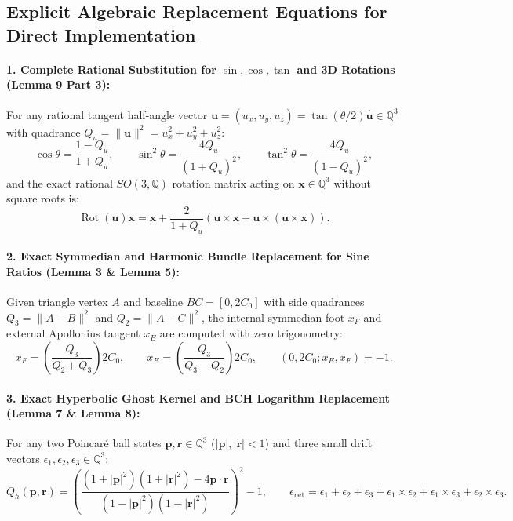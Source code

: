 \documentclass[11pt, a4paper]{article}
\begin{document}
\subsection{Explicit Algebraic Replacement Equations for Direct Implementation}

\paragraph{1. Complete Rational Substitution for $\sin, \cos, \tan$ and 3D Rotations (Lemma 9 Part 3):}
For any rational tangent half-angle vector $\mathbf{u} = (u_x, u_y, u_z) = \tan(\theta/2)\hat{\mathbf{u}} \in \mathbb{Q}^3$ with quadrance $Q_u = \|\mathbf{u}\|^2 = u_x^2 + u_y^2 + u_z^2$:
\begin{equation}
\cos\theta = \frac{1 - Q_u}{1 + Q_u}, \qquad \sin^2\theta = \frac{4 Q_u}{(1 + Q_u)^2}, \qquad \tan^2\theta = \frac{4 Q_u}{(1 - Q_u)^2},
\label{eq:rep-weierstrass}
\end{equation}
and the exact rational $SO(3,\mathbb{Q})$ rotation matrix acting on $\mathbf{x} \in \mathbb{Q}^3$ without square roots is:
\begin{equation}
\operatorname{Rot}(\mathbf{u})\mathbf{x} = \mathbf{x} + \frac{2}{1 + Q_u}\left(\mathbf{u} \times \mathbf{x} + \mathbf{u} \times (\mathbf{u} \times \mathbf{x})\right).
\end{equation}

\paragraph{2. Exact Symmedian and Harmonic Bundle Replacement for Sine Ratios (Lemma 3 \& Lemma 5):}
Given triangle vertex $A$ and baseline $BC = [0, 2C_0]$ with side quadrances $Q_3 = \|A - B\|^2$ and $Q_2 = \|A - C\|^2$, the internal symmedian foot $x_F$ and external Apollonius tangent $x_E$ are computed with zero trigonometry:
\begin{equation}
x_F = \left(\frac{Q_3}{Q_2 + Q_3}\right)2C_0, \qquad x_E = \left(\frac{Q_3}{Q_3 - Q_2}\right)2C_0, \qquad (0, 2C_0; x_E, x_F) = -1.
\end{equation}

\paragraph{3. Exact Hyperbolic Ghost Kernel and BCH Logarithm Replacement (Lemma 7 \& Lemma 8):}
For any two Poincaré ball states $\mathbf{p}, \mathbf{r} \in \mathbb{Q}^3$ ($|\mathbf{p}|, |\mathbf{r}| < 1$) and three small drift vectors $\epsilon_1, \epsilon_2, \epsilon_3 \in \mathbb{Q}^3$:
\begin{equation}
Q_h(\mathbf{p}, \mathbf{r}) = \left(\frac{(1 + |\mathbf{p}|^2)(1 + |\mathbf{r}|^2) - 4\mathbf{p}\cdot\mathbf{r}}{(1 - |\mathbf{p}|^2)(1 - |\mathbf{r}|^2)}\right)^2 - 1, \qquad
\epsilon_{\text{net}} = \epsilon_1 + \epsilon_2 + \epsilon_3 + \epsilon_1\times\epsilon_2 + \epsilon_1\times\epsilon_3 + \epsilon_2\times\epsilon_3.
\label{eq:rep-bch}
\end{equation}
\end{document}
